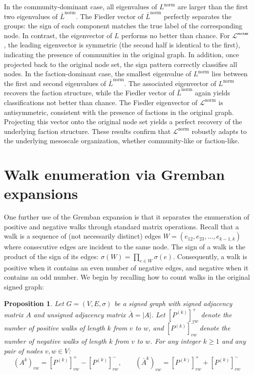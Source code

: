 \documentclass[reprint,onecolumn]{article}
\newtheorem{proposition}[theorem]{Proposition}
\newcommand{\1}{\mathbb{1}}
\newcommand{\0}{\mathbf{0}}
\begin{document}
In the community-dominant case, all eigenvalues of \(L^{\text{norm}}\) are larger than the first two eigenvalues of \(\bar L^{\text{norm}}\). The Fiedler vector of \(\bar L^{\text{norm}}\) perfectly separates the groups: the sign of each component matches the true label of the corresponding node. In contrast, the eigenvector of \(L\) performs no better than chance. For \(\mathcal{L^{\text{norm}}}\), the leading eigenvector is symmetric (the second half is identical to the first), indicating the presence of communities in the original graph. In addition, once projected back to the original node set, the sign pattern correctly classifies all nodes.
In the faction-dominant case, the smallest eigenvalue of \(L^{\text{norm}}\) lies between the first and second eigenvalues of \(\bar L^{\text{norm}}\). The associated eigenvector of $L^{\text{norm}}$ recovers the faction structure, while the Fiedler vector of \(\bar L^{\text{norm}}\) again yields classifications not better than chance. The Fiedler eigenvector of \(\mathcal{L}^{\text{norm}}\) is antisymmetric, consistent with the presence of factions in the original graph. Projecting this vector onto the original node set yields a perfect recovery of the underlying faction structure. These results confirm that \(\mathcal{L}^{\text{norm}}\) robustly adapts to the underlying mesoscale organization, whether community-like or faction-like.

\section{Walk enumeration via Gremban expansions}   \label{app:walk_enumeration}

One further use of the Gremban expansion is that it separates the enumeration of positive and negative walks through standard matrix operations. Recall that a walk is a sequence of (not necessarily distinct) edges \( W = (e_{12}, e_{23}, \ldots, e_{k-1,k}) \) where consecutive edges are incident to the same node. The sign of a walk is the product of the sign of its edges: $\sigma(W)=\prod_{e\in W} \sigma(e)$. Consequently, a walk is positive when it contains an even number of negative edges, and negative when it contains an odd number.
We begin by recalling how to count walks in the original signed graph:

\begin{proposition}  \label{prop:walk_adjacency_lemma}
Let \(G=(V,E,\sigma)\) be a signed graph with signed adjacency matrix \(A\) and unsigned adjacency matrix \(\bar A=|A|\). Let $[P^{(k)}]^+_{vw}$ denote the number of positive walks 
of length $k$ from $v$ to $w$, and $[P^{(k)}]^-_{vw}$ denote the number of negative walks of length $k$ from $v$ to $w$. For any integer \(k\ge1\) and any pair of nodes \(v,w\in V\):
\[
(A^k)_{vw}
=[P^{(k)}]^+_{vw}  -  [P^{(k)}]^-_{vw},
\qquad 
(\bar A^k)_{vw}
=[P^{(k)}]^+_{vw} +  [P^{(k)}]^-_{vw}
\]
\end{proposition}
\end{document}
